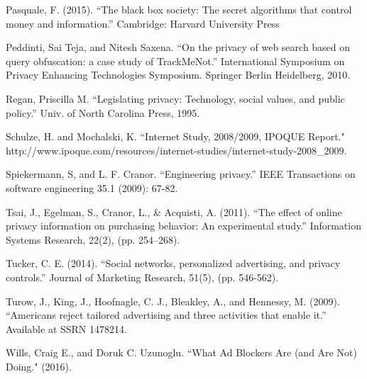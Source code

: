 \documentclass[conference]{IEEEtran}
\begin{document}
\begin{thebibliography}{99}
 Pasquale, F. (2015). “The black box society: The secret algorithms that control money and information.” Cambridge: Harvard University Press

 Peddinti, Sai Teja, and Nitesh Saxena. “On the privacy of web search based on query obfuscation: a case study of TrackMeNot.” International Symposium on Privacy Enhancing Technologies Symposium. Springer Berlin Heidelberg, 2010.

 Regan, Priscilla M. “Legislating privacy: Technology, social values, and public policy.” Univ. of North Carolina Press, 1995.

 Schulze, H. and Mochalski, K. “Internet Study, 2008/2009, IPOQUE Report."
http://www.ipoque.com/resources/internet-studies/internet-study-2008\_2009.

 Spiekermann, S, and L. F. Cranor. “Engineering privacy.” IEEE Transactions on software engineering 35.1 (2009): 67-82.

 Tsai, J., Egelman, S., Cranor, L., \& Acquisti, A. (2011). “The effect of online privacy information on purchasing behavior: An experimental study.” Information Systems Research, 22(2), (pp. 254–268).

 Tucker, C. E. (2014). “Social networks, personalized advertising, and privacy controls.” Journal of Marketing Research, 51(5), (pp. 546-562).

 Turow, J., King, J., Hoofnagle, C. J., Bleakley, A., and Hennessy, M. (2009). “Americans reject tailored advertising and three activities that enable it.” Available at SSRN 1478214.

 Wills, Craig E., and Doruk C. Uzunoglu. “What Ad Blockers Are (and Are Not) Doing." (2016).

\end{thebibliography}
\end{document}
